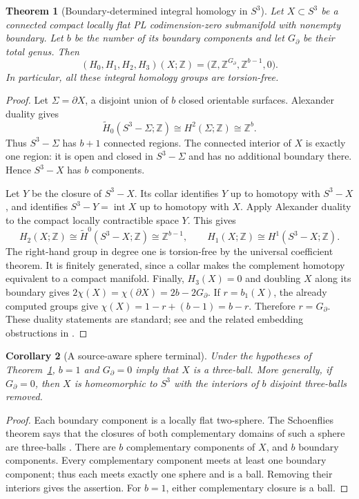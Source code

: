 \documentclass[11pt]{article}
\newtheorem{theorem}{Theorem}[section]
\newtheorem{corollary}[theorem]{Corollary}
\theoremstyle{definition}
\theoremstyle{remark}
\newcommand{\Z}{\mathbb Z}
\begin{document}
\begin{theorem}[Boundary-determined integral homology in $S^3$]
\label{thm:s3}
Let $X\subset S^3$ be a connected compact locally flat PL codimension-zero
submanifold with nonempty boundary. Let $b$ be the number of its boundary
components and let $G_\partial$ be their total genus. Then
\begin{equation}
 (H_0,H_1,H_2,H_3)(X;\Z)
 =\bigl(\Z,\Z^{G_\partial},\Z^{b-1},0\bigr).
 \label{eq:s3-homology}
\end{equation}
In particular, all these integral homology groups are torsion-free.
\end{theorem}

\begin{proof}
Let $\Sigma=\partial X$, a disjoint union of $b$ closed orientable surfaces.
Alexander duality gives
\[
 \widetilde H_0(S^3-\Sigma;\Z)\cong H^2(\Sigma;\Z)\cong\Z^b.
\]
Thus $S^3-\Sigma$ has $b+1$ connected regions. The connected interior of $X$
is exactly one region: it is open and closed in $S^3-\Sigma$ and has no
additional boundary there. Hence $S^3-X$ has $b$ components.

Let $Y$ be the closure of $S^3-X$. Its collar identifies $Y$ up to homotopy
with $S^3-X$, and identifies $S^3-Y=\operatorname{int}X$ up to homotopy with
$X$. Apply Alexander duality to the compact locally contractible space $Y$.
This gives
\[
 H_2(X;\Z)\cong\widetilde H^0(S^3-X;\Z)\cong\Z^{b-1},
 \qquad H_1(X;\Z)\cong H^1(S^3-X;\Z).
\]
The right-hand group in degree one is torsion-free by the universal
coefficient theorem. It is finitely generated, since a collar makes the
complement homotopy equivalent to a compact manifold. Finally, $H_3(X)=0$
and doubling $X$ along its boundary gives
$2\chi(X)=\chi(\partial X)=2b-2G_\partial$. If $r=b_1(X)$, the already
computed groups give $\chi(X)=1-r+(b-1)=b-r$. Therefore $r=G_\partial$.
These duality statements are standard; see \cite{hatcher} and the related
embedding obstructions in \cite{tonkonog}.
\end{proof}

\begin{corollary}[A source-aware sphere terminal]
\label{cor:ball}
Under the hypotheses of Theorem~\ref{thm:s3}, $b=1$ and $G_\partial=0$
imply that $X$ is a three-ball. More generally, if $G_\partial=0$, then $X$
is homeomorphic to $S^3$ with the interiors of $b$ disjoint three-balls removed.
\end{corollary}
\begin{proof}
Each boundary component is a locally flat two-sphere. The Schoenflies
theorem says that the closures of both complementary domains of such a
sphere are three-balls \cite[Theorem 5]{brown}. There are $b$ complementary
components of $X$, and $b$ boundary components. Every complementary
component meets at least one boundary component; thus each meets exactly
one sphere and is a ball. Removing their interiors gives the assertion.
For $b=1$, either complementary closure is a ball.
\end{proof}
\end{document}
